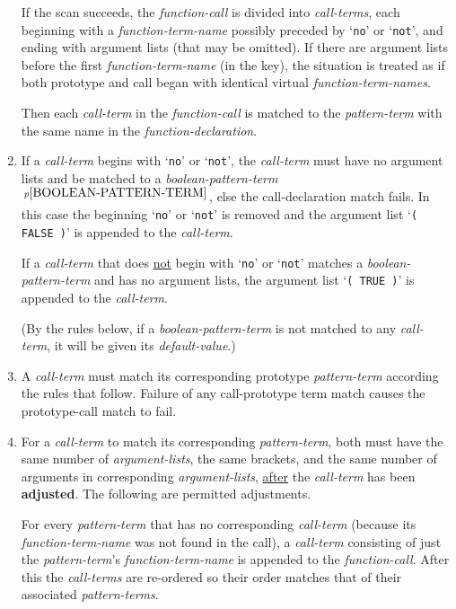\documentclass[12pt]{article}
\newcommand{\key}[1]{{\rm \bfseries #1}}
\newcommand{\pagnote}[1]{$\,^{p\pageref{#1}}$}
\begin{document}
\begin{enumerate}
If the scan succeeds, the {\em function-call} is divided into
{\em call-terms}, each beginning with a {\em function-term-name}
possibly preceded by `{\tt no}' or `{\tt not}', and ending with
argument lists (that may be omitted).
If there are argument lists before the first {\em function-term-name}
(in the key), the situation is treated as
if both prototype and call began with identical virtual
{\em function-term-names}.

Then each {\em call-term} in the {\em function-call} is matched to
the {\em pattern-term} with the same name in the {\em function-declaration}.

\item\label{BOOLEAN-CALL-TERMS}
If a {\em call-term} begins with `{\tt no}' or `{\tt not}',
the {\em call-term} must have no argument lists and be matched to a
{\em boolean-pattern-term}\pagnote{BOOLEAN-PATTERN-TERM},
else the call-declaration match fails.
In this case the beginning `{\tt no}' or `{\tt not}' is removed and the
argument list `{\tt ( FALSE )}' is appended to the {\em call-term}.

If a {\em call-term} that does \underline{not}
begin with `{\tt no}' or `{\tt not}'
matches a {\em boolean-pattern-term}
and has no argument lists, the
argument list `{\tt ( TRUE )}' is appended to the {\em call-term}.

(By the rules below, if a {\em boolean-pattern-term} is not matched to
any {\em call-term}, it will be given its {\em default-value}.)

\item\label{CALL-TERM-MATCHING}
A {\em call-term}
must match its corresponding prototype {\em pattern-term} according
the rules that follow.  Failure of any call-prototype term match
causes the prototype-call match to fail.

\item\label{CALL-DECLARATION-CALL-TERM-ADJUSTMENT}
For a {\em call-term} to match its corresponding {\em pattern-term},
both must have the same number of {\em argument-lists}, the same brackets,
and the same number of
arguments in corresponding {\em argument-lists}, \underline{after}
the {\em call-term} has been \key{adjusted}.  The following are
permitted adjustments.

For every {\em pattern-term} that has no corresponding {\em call-term}
(because its {\em function-term-name} was not found in the call),
a {\em call-term} consisting of just the {\em pattern-term}'s
{\em function-term-name} is appended to the {\em function-call}.
After this the {\em call-terms} are re-ordered so their order
matches that of their associated {\em pattern-terms}.


\end{enumerate}
\end{document}
